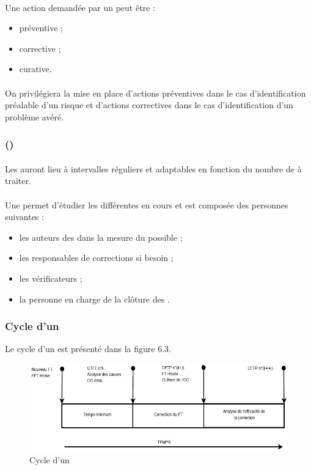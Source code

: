 \paragraph*{} Une action demandée par un \OCCourt peut être :
\begin{itemize}
\item préventive ;
\item corrective ;
\item curative.
\end{itemize}

\paragraph*{} On privilégiera la mise en place d'actions préventives dans le cas d'identification préalable
d'un risque et d'actions correctives dans le cas d'identification d'un problème avéré.


\subsubsection*{\CTFT (\CTFTCourt)}
\paragraph*{} Les \CTFTCourt auront lieu à intervalles réguliers et adaptables en fonction du nombre de \FTCourt à
traiter.

\paragraph*{} Une \CTFTCourt permet d'étudier les différentes \FTCourt en cours et est composée des personnes
suivantes :
\begin{itemize}
\item les auteurs des \FFTCourt dans la mesure du possible ;
\item les responsables de corrections si besoin ;
\item les vérificateurs ;
\item la personne en charge de la clôture des \OCCourt .
\end{itemize}

\subsubsection*{Cycle d'un \FTCourt}
Le cycle d'un \FTCourt est présenté dans la figure 6.3.

\begin{figure}[h]
   \center
   \caption{\label{Figure 6.1} Cycle d'un \FT}
   \includegraphics[width=13cm]{./images/cycle_Dun_FT.jpg}
\end{figure}

